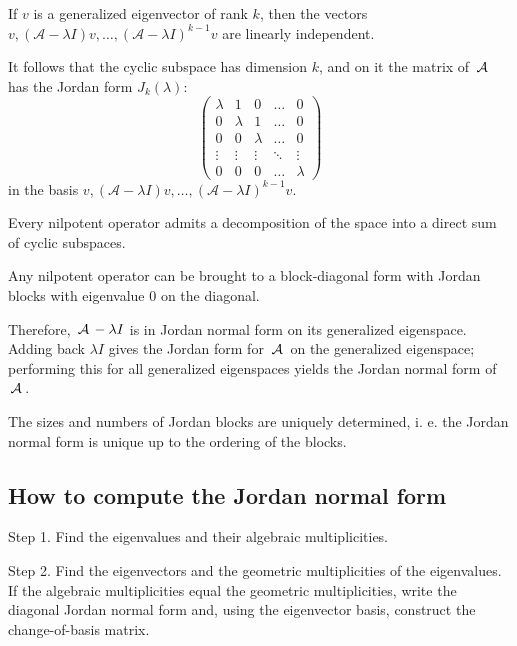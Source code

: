 \begin{lemma}
If $v$ is a generalized eigenvector of rank $k$, then the vectors $v, (\mathcal{A} - \lambda I) v, \ldots, (\mathcal{A} - \lambda I)^{k-1} v$ are linearly independent.
\end{lemma}

It follows that the cyclic subspace has dimension $k$, and on it the matrix of $\,\mathcal{A}\,$ has the Jordan form $J_k(\lambda)$:
$$
\begin{pmatrix}
\lambda & 1 & 0 & \ldots & 0 \\
0 & \lambda & 1 & \ldots & 0 \\
0 & 0 & \lambda & \ldots & 0 \\
\vdots & \vdots & \vdots & \ddots & \vdots \\
0 & 0 & 0 & \ldots & \lambda
\end{pmatrix}
$$
in the basis $v, (\mathcal{A} - \lambda I) v, \ldots, (\mathcal{A} - \lambda I)^{k-1} v$.

\begin{lemma}
Every nilpotent operator admits a decomposition of the space into a direct sum of cyclic subspaces.
\end{lemma}

\begin{corollary}
Any nilpotent operator can be brought to a block-diagonal form with Jordan blocks with eigenvalue $0$ on the diagonal.
\end{corollary}

Therefore, $\,\mathcal{A}\,-\lambda I$ is in Jordan normal form on its generalized eigenspace. Adding back $\lambda I$ gives the Jordan form for $\,\mathcal{A}\,$ on the generalized eigenspace; performing this for all generalized eigenspaces yields the Jordan normal form of $\,\mathcal{A}\,$.

\begin{theorem}
The sizes and numbers of Jordan blocks are uniquely determined, i. e. the Jordan normal form is unique up to the ordering of the blocks.
\end{theorem}

\subsection{How to compute the Jordan normal form}

Step 1. Find the eigenvalues and their algebraic multiplicities.

Step 2. Find the eigenvectors and the geometric multiplicities of the eigenvalues. If the algebraic multiplicities equal the geometric multiplicities, write the diagonal Jordan normal form and, using the eigenvector basis, construct the change-of-basis matrix.

